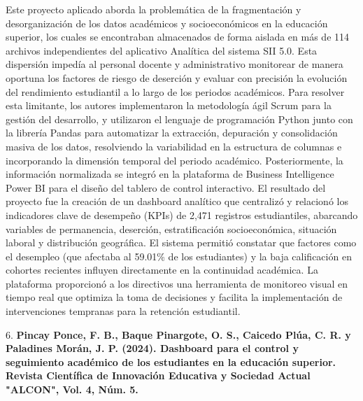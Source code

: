 Este proyecto aplicado aborda la problemática de la fragmentación y desorganización de los datos académicos y socioeconómicos en la educación superior, los cuales se encontraban almacenados de forma aislada en más de 114 archivos independientes del aplicativo Analítica del sistema SII 5.0. Esta dispersión impedía al personal docente y administrativo monitorear de manera oportuna los factores de riesgo de deserción y evaluar con precisión la evolución del rendimiento estudiantil a lo largo de los periodos académicos.
Para resolver esta limitante, los autores implementaron la metodología ágil Scrum para la gestión del desarrollo, y utilizaron el lenguaje de programación Python junto con la librería Pandas para automatizar la extracción, depuración y consolidación masiva de los datos, resolviendo la variabilidad en la estructura de columnas e incorporando la dimensión temporal del periodo académico. Posteriormente, la información normalizada se integró en la plataforma de Business Intelligence Power BI para el diseño del tablero de control interactivo.
El resultado del proyecto fue la creación de un dashboard analítico que centralizó y relacionó los indicadores clave de desempeño (KPIs) de 2,471 registros estudiantiles, abarcando variables de permanencia, deserción, estratificación socioeconómica, situación laboral y distribución geográfica. El sistema permitió constatar que factores como el desempleo (que afectaba al 59.01\% de los estudiantes) y la baja calificación en cohortes recientes influyen directamente en la continuidad académica. La plataforma proporcionó a los directivos una herramienta de monitoreo visual en tiempo real que optimiza la toma de decisiones y facilita la implementación de intervenciones tempranas para la retención estudiantil.

6. \textbf{Pincay Ponce, F. B., Baque Pinargote, O. S., Caicedo Plúa, C. R. y Paladines Morán, J. P. (2024). Dashboard para el control y seguimiento académico de los estudiantes en la educación superior. Revista Científica de Innovación Educativa y Sociedad Actual "ALCON", Vol. 4, Núm. 5.}

